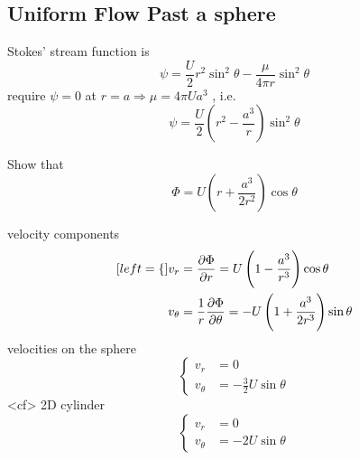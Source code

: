 \subsection{Uniform Flow Past a sphere}
Stokes' stream function is
\[
\psi = \frac{U}{2}r^2\sin^2\theta - \frac{\mu}{4\pi r}\sin^2\theta
\]
require $\psi = 0$ at $r=a\Longrightarrow \mu = 4\pi Ua^3$ , i.e.
\begin{equation}
\psi = \frac{U}{2}\left(r^2-\frac{a^3}{r}\right)\sin^2\theta
\label{eq: 7-3-8}
\end{equation}
\begin{exercise}{Show that}
\begin{equation}
\Phi = U\left(r + \frac{a^3}{2r^2}\right)\cos\theta
\label{eq: 7-3-9}
\end{equation}
\end{exercise}
velocity components
\begin{subequations}
\label{eq: 7-3-10}
\begin{align}[left = \empheqlbrace\,]
v_r&=\frac{\partial\Phi}{\partial r} = U\left(1-\frac{a^3}{r^3} \right)\cos\theta\label{eq: 7-3-10a} \\
v_\theta&=\frac{1}{r}\frac{\partial\Phi}{\partial \theta} = -U\left(1+\frac{a^3}{2r^3}\right)\sin\theta  \label{eq: 7-3-10b}
\end{align}
\end{subequations}
velocities on the sphere
\[
\left\{
\begin{aligned}
v_r &= 0\\
v_\theta &= -\frac{3}{2}U\sin\theta
\end{aligned}
\right.
\]
<cf> 2D cylinder
\[
\left\{
\begin{aligned}
v_r &= 0\\
v_\theta &= -2U\sin\theta
\end{aligned}
\right.
\]